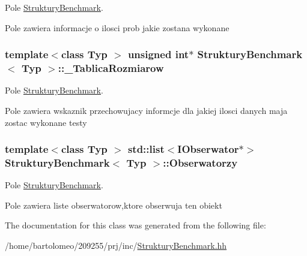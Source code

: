 Pole \hyperlink{class_struktury_benchmark}{Struktury\-Benchmark}. 

Pole zawiera informacje o ilosci prob jakie zostana wykonane \hypertarget{class_struktury_benchmark_a9077a191d28f29d9b2eba8d4e8f72ce8}{
\subsubsection[{\-\_\-\-Tablica\-Rozmiarow}]{\setlength{\rightskip}{0pt plus 5cm}template$<$class Typ $>$ unsigned int$\ast$ {\bf Struktury\-Benchmark}$<$ Typ $>$\-::\-\_\-\-Tablica\-Rozmiarow\hspace{0.3cm}{\ttfamily [private]}}}\label{class_struktury_benchmark_a9077a191d28f29d9b2eba8d4e8f72ce8}


Pole \hyperlink{class_struktury_benchmark}{Struktury\-Benchmark}. 

Pole zawiera wskaznik przechowujacy informcje dla jakiej ilosci danych maja zostac wykonane testy \hypertarget{class_struktury_benchmark_a5c96eb86dfccdad59d41d478ca8d66c3}{
\subsubsection[{Obserwatorzy}]{\setlength{\rightskip}{0pt plus 5cm}template$<$class Typ $>$ std\-::list$<${\bf I\-Obserwator}$\ast$$>$ {\bf Struktury\-Benchmark}$<$ Typ $>$\-::Obserwatorzy\hspace{0.3cm}{\ttfamily [private]}}}\label{class_struktury_benchmark_a5c96eb86dfccdad59d41d478ca8d66c3}


Pole \hyperlink{class_struktury_benchmark}{Struktury\-Benchmark}. 

Pole zawiera liste obserwatorow,ktore obserwuja ten obiekt 

The documentation for this class was generated from the following file\-:\begin{DoxyCompactItemize}
\item 
/home/bartolomeo/209255/prj/inc/\hyperlink{_struktury_benchmark_8hh}{Struktury\-Benchmark.\-hh}\end{DoxyCompactItemize}
